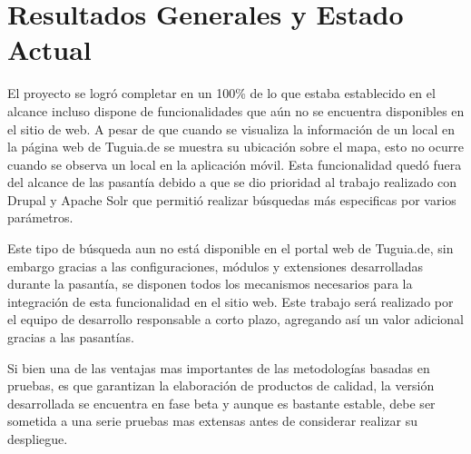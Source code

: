 \section{Resultados Generales y Estado Actual}

El proyecto se logró completar en un 100\% de lo que estaba establecido en el alcance incluso dispone de funcionalidades que aún no se encuentra disponibles en el sitio de web. A pesar de que cuando se visualiza la información de un local en la página web de Tuguia.de se muestra su ubicación sobre el mapa, esto no ocurre cuando se observa un local en la aplicación móvil. Esta funcionalidad quedó fuera del alcance de las pasantía debido a que se dio prioridad al trabajo realizado con Drupal y Apache Solr que permitió realizar búsquedas más especificas por varios parámetros. 

Este tipo de búsqueda aun no está disponible en el portal web de Tuguia.de, sin embargo gracias a las configuraciones, módulos y extensiones desarrolladas durante la pasantía, se disponen todos los mecanismos necesarios para la integración de esta funcionalidad en el sitio web. Este trabajo será realizado por el equipo de desarrollo responsable a corto plazo, agregando así un valor adicional gracias a las pasantías.

Si bien una de las ventajas mas importantes de las metodologías basadas en pruebas, es que garantizan la elaboración de productos de calidad, la versión desarrollada se encuentra en fase beta y aunque es bastante estable, debe ser sometida a una serie pruebas mas extensas antes de considerar realizar su despliegue.